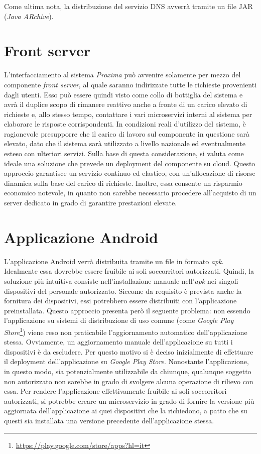 \documentclass[a4paper,12pt]{report}
\begin{document}
Come ultima nota, la distribuzione del servizio DNS avverrà tramite un file JAR (\emph{Java ARchive}).

\section{Front server}

L'interfacciamento al sistema \emph{Proxima} può avvenire solamente per mezzo del componente \emph{front server}, al quale saranno indirizzate tutte le richieste provenienti dagli utenti. Esso può essere quindi visto come collo di bottiglia del sistema e avrà il duplice scopo di rimanere reattivo anche a fronte di un carico elevato di richieste e, allo stesso tempo, contattare i vari microservizi interni al sistema per elaborare le risposte corrispondenti. In condizioni reali d'utilizzo del sistema, è ragionevole presupporre che il carico di lavoro sul componente in questione sarà elevato, dato che il sistema sarà utilizzato a livello nazionale ed eventualmente esteso con ulteriori servizi. Sulla base di questa considerazione, si valuta come ideale una soluzione che prevede un deployment del componente su cloud. Questo approccio garantisce un servizio continuo ed elastico, con un'allocazione di risorse dinamica sulla base del carico di richieste. Inoltre, essa consente un risparmio economico notevole, in quanto non sarebbe necessario procedere all'acquisto di un server dedicato in grado di garantire prestazioni elevate.

\section{Applicazione Android}

L'applicazione Android verrà distribuita tramite un file in formato \emph{apk}. Idealmente essa dovrebbe essere fruibile ai soli soccorritori autorizzati. Quindi, la soluzione più intuitiva consiste nell'installazione manuale nell'\emph{apk} nei singoli dispositivi del personale autorizzato. Siccome da requisito è prevista anche la fornitura dei dispositivi, essi potrebbero essere distribuiti con l'applicazione preinstallata. Questo approccio presenta però il seguente problema: non essendo l'applicazione su sistemi di distribuzione di uso comune (come \emph{Google Play Store}\footnote{\url{https://play.google.com/store/apps?hl=it}}) viene reso non praticabile l'aggiornamento automatico dell'applicazione stessa.
Ovviamente, un aggiornamento manuale dell'applicazione su tutti i dispositivi è da escludere. Per questo motivo si è deciso inizialmente di effettuare il deployment dell'applicazione su \emph{Google Play Store}. Nonostante l'applicazione, in questo modo, sia potenzialmente utilizzabile da chiunque, qualunque soggetto non autorizzato non sarebbe in grado di svolgere alcuna operazione di rilievo con essa. Per rendere l'applicazione effettivamente fruibile ai soli soccorritori autorizzati, si potrebbe creare un microservizio in grado di fornire la versione più aggiornata dell'applicazione ai quei dispositivi che la richiedono, a patto che su questi sia installata una versione precedente dell'applicazione stessa.
\end{document}
